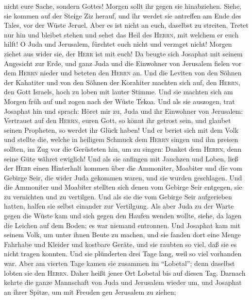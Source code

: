 nicht eure Sache, sondern Gottes!  Morgen sollt ihr gegen
sie hinabziehen. Siehe, sie kommen auf der Steige Ziz herauf, und ihr
werdet sie antreffen am Ende des Tales, vor der Wüste Jeruel.
 Aber es ist nicht an euch, daselbst zu streiten. Tretet
nur hin und bleibet stehen und sehet das Heil des \textsc{Herrn}, mit
welchem er euch hilft! O Juda und Jerusalem, fürchtet euch nicht und
verzaget nicht! Morgen ziehet aus wider sie, der \textsc{Herr} ist mit
euch!  Da beugte sich Josaphat mit seinem Angesicht zur
Erde, und ganz Juda und die Einwohner von Jerusalem fielen vor dem
\textsc{Herrn} nieder und beteten den \textsc{Herrn} an. 
Und die Leviten von den Söhnen der Kahatiter und von den Söhnen der
Korahiter machten sich auf, den \textsc{Herrn}, den Gott Israels, hoch
zu loben mit lauter Stimme.  Und sie machten sich am
Morgen früh auf und zogen nach der Wüste Tekoa. Und als sie auszogen,
trat Josaphat hin und sprach: Höret mir zu, Juda und ihr Einwohner von
Jerusalem: Vertrauet auf den \textsc{Herrn}, euren Gott, so könnt ihr
getrost sein, und glaubet seinen Propheten, so werdet ihr Glück haben!
 Und er beriet sich mit dem Volk und stellte die, welche
in heiligem Schmuck dem \textsc{Herrn} singen und ihn preisen sollten,
im Zug vor die Gerüsteten hin, um zu singen: Danket dem \textsc{Herrn},
denn seine Güte währet ewiglich!  Und als sie anfingen
mit Jauchzen und Loben, ließ der \textsc{Herr} einen Hinterhalt kommen
über die Ammoniter, Moabiter und die vom Gebirge Seir, die wider Juda
gekommen waren, und sie wurden geschlagen.  Und die
Ammoniter und Moabiter stellten sich denen vom Gebirge Seir entgegen,
sie zu vernichten und zu vertilgen. Und als sie die vom Gebirge Seir
aufgerieben hatten, halfen sie selbst einander zur Vertilgung.
 Als aber Juda zu der Warte gegen die Wüste kam und sich
gegen den Haufen wenden wollte, siehe, da lagen die Leichen auf dem
Boden; es war niemand entronnen.  Und Josaphat kam mit
seinem Volk, um unter ihnen Beute zu machen, und sie fanden dort eine
Menge Fahrhabe und Kleider und kostbare Geräte, und sie raubten so viel,
daß sie es nicht tragen konnten. Und sie plünderten drei Tage lang, weil
so viel vorhanden war.  Aber am vierten Tage kamen sie
zusammen im ``Lobetal''; denn daselbst lobten sie den \textsc{Herrn}.
Daher heißt jener Ort Lobetal bis auf diesen Tag. 
Darnach kehrte die ganze Mannschaft von Juda und Jerusalem wieder um,
und Josaphat an ihrer Spitze, um mit Freuden gen Jerusalem zu ziehen;

